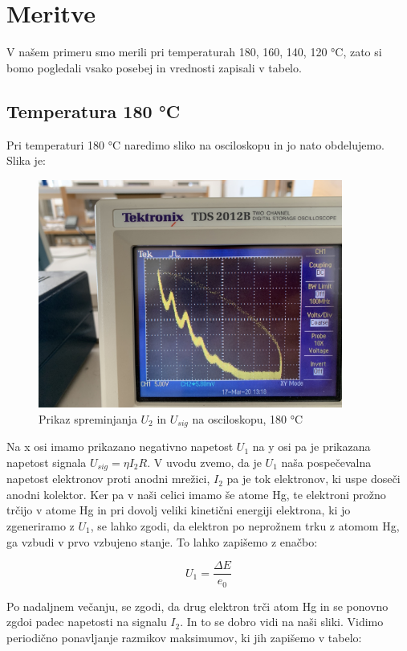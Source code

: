 \documentclass[11pt, a4paper]{article}
\theoremstyle{definition}
\theoremstyle{example}
\theoremstyle{izrek}
\begin{document}
\pagebreak
\section{Meritve}
V našem primeru smo merili pri temperaturah 180, 160, 140, 120 °C, zato si bomo pogledali vsako posebej in vrednosti zapisali v tabelo. 
\subsection{Temperatura 180 °C}
Pri temperaturi 180 °C naredimo sliko na osciloskopu in jo nato obdelujemo. Slika je: 

\begin{figure}[H]
    \centering
    \includegraphics[width=10cm]{T=180_max_napetost.jpg}
    \caption{Prikaz spreminjanja $U_2$ in $U_{sig}$ na osciloskopu, 180 °C}
\end{figure}
Na x osi imamo prikazano negativno napetost $U_1$ na y osi pa je prikazana napetost signala $U_{sig}=\eta I_2 R.$
V uvodu zvemo, da je $U_1$ naša pospečevalna napetost elektronov proti anodni mrežici, $I_2$ pa je tok elektronov, ki uspe doseči anodni kolektor. Ker pa v naši celici imamo še atome Hg, te elektroni prožno trčijo v atome Hg in pri dovolj veliki kinetični energiji elektrona, ki jo zgeneriramo z $U_1$, se lahko zgodi, da elektron po neprožnem trku z atomom Hg, ga vzbudi v prvo vzbujeno stanje. To lahko zapišemo z enačbo: 


$$U_1=\frac{\Delta E}{e_0}$$

Po nadaljnem večanju, se zgodi, da drug elektron trči atom Hg in se ponovno zgdoi padec napetosti na signalu $I_2$. In to se dobro vidi na naši sliki. Vidimo periodično ponavljanje razmikov maksimumov, ki jih zapišemo v tabelo: 
\end{document}
